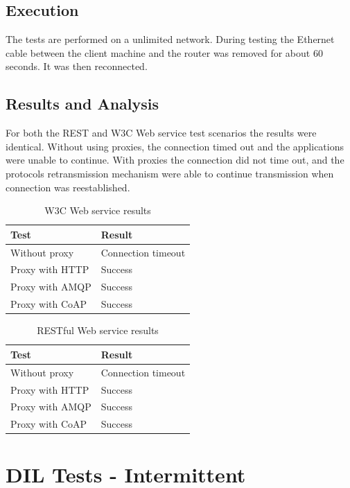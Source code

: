 \subsection{Execution}

 The tests are performed on a unlimited network. During testing the Ethernet
 cable between the client machine and the router was removed for about 60
 seconds. It was then reconnected.

\subsection{Results and Analysis}

For both the REST and W3C Web service test scenarios the results were identical.
Without using proxies, the connection timed out and the applications were unable
to continue. With proxies the connection did not time out, and the protocols
retransmission mechanism were able to continue transmission when connection was
reestablished.

\begin{table}[h!]
\begin{tabular}{| l | l |}
\hline
  \textbf{Test} & \textbf{Result} \\ \hline
  Without proxy & Connection timeout \\ \hline
  Proxy with HTTP & Success \\ \hline
  Proxy with AMQP & Success \\ \hline
  Proxy with CoAP & Success \\ \hline
\end{tabular}
\caption{W3C Web service results}
\end{table}

\begin{table}[h!]
\begin{tabular}{| l | l |}
\hline
  \textbf{Test} & \textbf{Result} \\ \hline
  Without proxy & Connection timeout \\ \hline
  Proxy with HTTP & Success \\ \hline
  Proxy with AMQP & Success \\ \hline
  Proxy with CoAP & Success \\ \hline
\end{tabular}
\caption{RESTful Web service results}
\end{table}



\section{DIL Tests - Intermittent}

